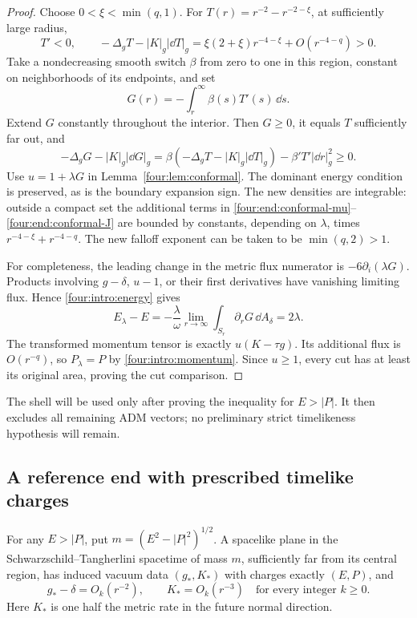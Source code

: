 \begin{proof}
Choose \(0<\xi<\min(q,1)\). For
\(T(r)=r^{-2}-r^{-2-\xi}\), at sufficiently large radius,
\[
 T'<0,\qquad
 -\Delta_gT-|K|_g|\dd T|_g
 =\xi(2+\xi)r^{-4-\xi}+O(r^{-4-q})>0.
\]
Take a nondecreasing smooth switch \(\beta\) from zero to one in this
region, constant on neighborhoods of its endpoints, and set
\[
 G(r)=-\int_r^\infty\beta(s)T'(s)\,\dd s.
\]
Extend \(G\) constantly throughout the interior. Then \(G\ge0\), it
equals \(T\) sufficiently far out, and
\[
 -\Delta_gG-|K|_g|\dd G|_g
 =\beta(-\Delta_gT-|K|_g|\dd T|_g)
       -\beta'T'|\dd r|_g^2\ge0.
\]
Use \(u=1+\lambda G\) in Lemma~\ref{four:lem:conformal}. The dominant
energy condition is preserved, as is the boundary expansion sign.
The new densities are integrable: outside a compact set the additional
terms in \eqref{four:end:conformal-mu}--\eqref{four:end:conformal-J} are bounded
by constants, depending on \(\lambda\), times
\(r^{-4-\xi}+r^{-4-q}\). The new falloff exponent can be taken to be
\(\min(q,2)>1\).

For completeness, the leading change in the metric flux numerator is
\(-6\partial_i(\lambda G)\). Products involving
\(g-\delta\), \(u-1\), or their first derivatives have vanishing
limiting flux. Hence \eqref{four:intro:energy} gives
\[
 E_\lambda-E=-\frac{\lambda}{\omega}
       \lim_{r\to\infty}\int_{S_r}\partial_rG\,\dd A_\delta
       =2\lambda.
\]
The transformed momentum tensor is exactly \(u(K-\tau g)\). Its
additional flux is \(O(r^{-q})\), so \(P_\lambda=P\) by
\eqref{four:intro:momentum}. Since \(u\ge1\), every cut has at least its
original area, proving the cut comparison.
\end{proof}

The shell will be used only after proving the inequality for
\(E>|P|\). It then excludes all remaining ADM vectors; no preliminary
strict timelikeness hypothesis will remain.

\subsection{A reference end with prescribed timelike charges}

\begin{lemma}\label{four:end:boosted-plane}
For any \(E>|P|\), put \(m=(E^2-|P|^2)^{1/2}\). A spacelike plane
in the Schwarzschild--Tangherlini spacetime of mass \(m\), sufficiently
far from its central region, has induced vacuum data \((g_*,K_*)\)
with charges exactly \((E,P)\), and
\[
 g_*-\delta=O_k(r^{-2}),\qquad K_*=O_k(r^{-3})
 \quad\text{for every integer }k\ge0.
\]
Here \(K_*\) is one half the metric rate in the future normal direction.
\end{lemma}

